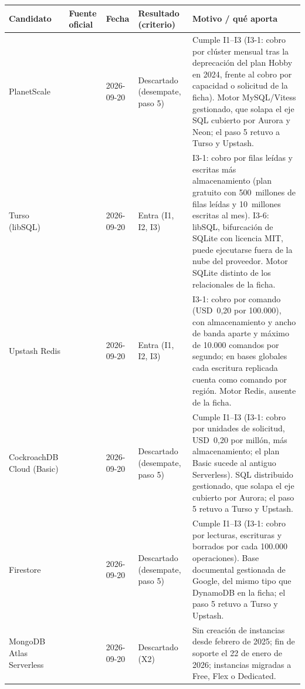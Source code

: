 \documentclass[12pt, letterpaper, table, xcdraw]{inf-pucv}
\begin{document}
{\scriptsize
\begin{longtable}{|p{2.5cm}|p{2.4cm}|p{1.4cm}|p{2.3cm}|p{5.2cm}|}
    \hline
    \textbf{Candidato} & \textbf{Fuente oficial} & \textbf{Fecha} & \textbf{Resultado (criterio)} & \textbf{Motivo / qué aporta} \\
    \hline
    \endhead
    PlanetScale & \parencite{planetscale2026pricing,planetscale2026hobbydeprecate} & 2026-09-20 & Descartado (desempate, paso 5) & Cumple I1--I3 (I3-1: cobro por clúster mensual tras la deprecación del plan Hobby en 2024, frente al cobro por capacidad o solicitud de la ficha). Motor MySQL/Vitess gestionado, que solapa el eje SQL cubierto por Aurora y Neon; el paso 5 retuvo a Turso y Upstash. \\ \hline
    Turso (libSQL) & \parencite{turso2026pricing,turso2026usage} & 2026-09-20 & Entra (I1, I2, I3) & I3-1: cobro por filas leídas y escritas más almacenamiento (plan gratuito con 500~millones de filas leídas y 10~millones escritas al mes). I3-6: libSQL, bifurcación de SQLite con licencia MIT, puede ejecutarse fuera de la nube del proveedor. Motor SQLite distinto de los relacionales de la ficha. \\ \hline
    Upstash Redis & \parencite{upstash2026redisbilling,upstash2026redispricing} & 2026-09-20 & Entra (I1, I2, I3) & I3-1: cobro por comando (USD~0,20 por 100.000), con almacenamiento y ancho de banda aparte y máximo de 10.000 comandos por segundo; en bases globales cada escritura replicada cuenta como comando por región. Motor Redis, ausente de la ficha. \\ \hline
    CockroachDB Cloud (Basic) & \parencite{cockroach2026basicproduct,cockroach2026pricing} & 2026-09-20 & Descartado (desempate, paso 5) & Cumple I1--I3 (I3-1: cobro por unidades de solicitud, USD~0,20 por millón, más almacenamiento; el plan Basic sucede al antiguo Serverless). SQL distribuido gestionado, que solapa el eje cubierto por Aurora; el paso 5 retuvo a Turso y Upstash. \\ \hline
    Firestore & \parencite{firestore2026pricing,firestore2026quotas,firestore2026enterprisepricing} & 2026-09-20 & Descartado (desempate, paso 5) & Cumple I1--I3 (I3-1: cobro por lecturas, escrituras y borrados por cada 100.000 operaciones). Base documental gestionada de Google, del mismo tipo que DynamoDB en la ficha; el paso 5 retuvo a Turso y Upstash. \\ \hline
    MongoDB Atlas Serverless & \parencite{mongodb2026flexmigration} & 2026-09-20 & Descartado (X2) & Sin creación de instancias desde febrero de 2025; fin de soporte el 22 de enero de 2026; instancias migradas a Free, Flex o Dedicated. \\ \hline
\end{longtable}
}
\end{document}
